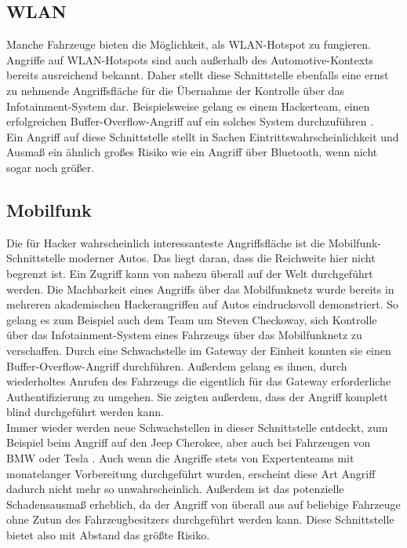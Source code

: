 \subsection{WLAN}
Manche Fahrzeuge bieten die Möglichkeit, als \ac{WLAN}-Hotspot zu fungieren. Angriffe auf \acs{WLAN}-Hotspots sind auch außerhalb des Automotive-Kontexts bereits ausreichend bekannt. Daher stellt diese Schnittstelle ebenfalls eine ernst zu nehmende  Angriffsfläche für die Übernahme der Kontrolle über das Infotainment-System dar. Beispielsweise gelang es einem Hackerteam, einen erfolgreichen Buffer-Overflow-Angriff auf ein solches System durchzuführen \cite[18]{Miller.2015}.\\
Ein Angriff auf diese Schnittstelle stellt in Sachen Eintrittswahrscheinlichkeit und Ausmaß ein ähnlich großes Risiko wie ein Angriff über Bluetooth, wenn nicht sogar noch größer.

\subsection{Mobilfunk}
Die für Hacker wahrscheinlich interessanteste Angriffsfläche ist die Mobilfunk-Schnittstelle moderner Autos. Das liegt daran, dass die Reichweite hier nicht begrenzt ist. Ein Zugriff kann von nahezu überall auf der Welt durchgeführt werden. Die Machbarkeit eines Angriffs über das Mobilfunknetz wurde bereits in mehreren akademischen Hackerangriffen auf Autos eindrucksvoll demonstriert. So gelang es zum Beispiel auch dem Team um Steven Checkoway, sich Kontrolle über das Infotainment-System eines Fahrzeugs über das Mobilfunknetz zu verschaffen. Durch eine Schwachstelle im Gateway der Einheit konnten sie einen Buffer-Overflow-Angriff durchführen. Außerdem gelang es ihnen, durch wiederholtes Anrufen des Fahrzeugs die eigentlich für das Gateway erforderliche Authentifizierung zu umgehen. Sie zeigten außerdem, dass der Angriff komplett blind durchgeführt werden kann. \cite[11]{Checkoway.2011} \\
Immer wieder werden neue Schwachstellen in dieser Schnittstelle entdeckt, zum Beispiel beim Angriff auf den Jeep Cherokee, aber auch bei Fahrzeugen von BMW oder Tesla \cite[35]{Wurm.2022}. Auch wenn die Angriffe stets von Expertenteams mit monatelanger Vorbereitung durchgeführt wurden, erscheint diese Art Angriff dadurch nicht mehr so unwahrscheinlich. Außerdem ist das potenzielle Schadensausmaß erheblich, da der Angriff von überall aus auf beliebige Fahrzeuge ohne Zutun des Fahrzeugbesitzers durchgeführt werden kann. Diese Schnittstelle bietet also mit Abstand das größte Risiko.



